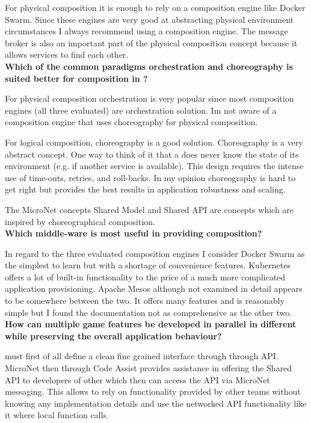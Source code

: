 For physical composition it is enough to rely on a composition engine like
Docker Swarm. Since these engines are very good at abstracting physical
environment circumstances I always recommend using a composition engine. The
message broker is also an important part of the physical composition concept
because it allows services to find each other.\\

\noindent
\textbf{Which of the common paradigms orchestration and choreography is suited better
for \ms{} composition in \ogs{}?}

For physical composition orchestration is very popular since most composition
engines (all three evaluated) are orchestration solution. Im not aware of a
composition engine that uses choreography for physical composition. 

For logical composition, choreography is a good solution. Choreography is a very
abstract concept. One way to think of it that a \ms{} does never know the state
of its environment (e.g. if another service is available). This design requires
the intense use of time-outs, retries, and roll-backs. In my opinion
choreography is hard to get right but provides the best results in
application robustness and scaling.

The MicroNet concepts Shared Model and Shared API are concepts which are
inspired by choreographical composition. \\

\newpage
\noindent
\textbf{Which middle-ware is most useful in providing \ms{} composition?}

In regard to the three evaluated composition engines I consider Docker Swarm as
the simplest to learn but with a shortage of convenience features. Kubernetes
offers a lot of built-in functionality to the price of a much more complicated
application provisioning. Apache Mesos although not examined in detail appears
to be somewhere between the two. It offers many features and is reasonably
simple but I found the documentation not as comprehensive as the other two.\\

\noindent
\textbf{How can multiple game features be developed in parallel in different
\mss{} while preserving the overall application behaviour?}

\mss{} must first of all define a clean fine grained interface through through
API. MicroNet then through Code Assist provides assistance in offering the
Shared API to developers of other \mss{} which then can access the API via
MicroNet messaging. This allows to rely on functionality provided by other \ms{}
teams without knowing any implementation details and use the networked API
functionality like it where local function calls.

